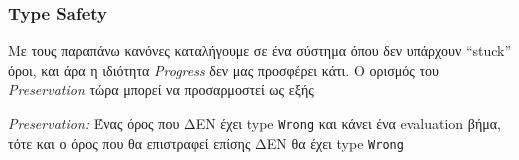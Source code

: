 \documentclass[a4paper,11pt]{article}
\begin{document}
\subsubsection*{Type Safety}
Με τους παραπάνω κανόνες καταλήγουμε σε ένα σύστημα όπου δεν υπάρχουν ``stuck'' όροι, και άρα η ιδιότητα \textit{Progress} δεν μας προσφέρει κάτι. Ο ορισμός του \textit{Preservation} τώρα μπορεί να προσαρμοστεί ως εξής
\begin{center}
 \textit{Preservation:} Ένας όρος που ΔΕΝ έχει type \verb|Wrong| και κάνει ένα evaluation βήμα, τότε και ο όρος που θα επιστραφεί επίσης ΔΕΝ θα έχει type \verb|Wrong|
\end{center}
\end{document}
